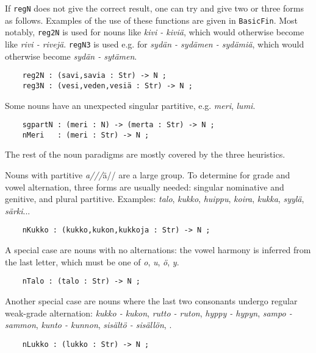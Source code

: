 \documentclass[11pt,a4paper]{article}
\begin{document}
If \texttt{regN} does not give the correct result, one can try and give 
two or three forms as follows. Examples of the use of these
functions are given in \texttt{BasicFin}. Most notably, \texttt{reg2N} is used
for nouns like \textit{kivi - kiviä}, which would otherwise become like
\textit{rivi - rivejä}. \texttt{regN3} is used e.g. for 
\textit{sydän - sydämen - sydämiä}, which would otherwise become
\textit{sydän - sytämen}.

\begin{verbatim}
    reg2N : (savi,savia : Str) -> N ;
    reg3N : (vesi,veden,vesiä : Str) -> N ;
\end{verbatim}

Some nouns have an unexpected singular partitive, e.g. \textit{meri}, \textit{lumi}.

\begin{verbatim}
    sgpartN : (meri : N) -> (merta : Str) -> N ;
    nMeri   : (meri : Str) -> N ;
\end{verbatim}

The rest of the noun paradigms are mostly covered by the three
heuristics.

Nouns with partitive \textit{a///}ä// are a large group. 
To determine for grade and vowel alternation, three forms are usually needed:
singular nominative and genitive, and plural partitive.
Examples: \textit{talo}, \textit{kukko}, \textit{huippu}, \textit{koira}, \textit{kukka}, \textit{syylä}, \textit{särki}...

\begin{verbatim}
    nKukko : (kukko,kukon,kukkoja : Str) -> N ;
\end{verbatim}

A special case are nouns with no alternations: 
the vowel harmony is inferred from the last letter,
which must be one of \textit{o}, \textit{u}, \textit{ö}, \textit{y}.

\begin{verbatim}
    nTalo : (talo : Str) -> N ;
\end{verbatim}

Another special case are nouns where the last two consonants
undergo regular weak-grade alternation:
\textit{kukko - kukon}, \textit{rutto - ruton}, \textit{hyppy - hypyn}, \textit{sampo - sammon},
\textit{kunto - kunnon}, \textit{sisältö - sisällön}, .

\begin{verbatim}
    nLukko : (lukko : Str) -> N ;
\end{verbatim}
\end{document}
